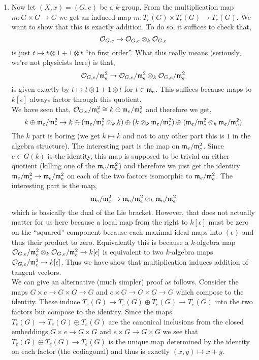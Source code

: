 \documentclass[12pt]{article}
\begin{document}
\begin{enumerate}
\item Now let $(X, x) = (G, e)$ be a $k$-group. From the multiplication map $m : G \times G \to G$ we get an induced map $m : T_e(G) \times T_e(G) \to T_e(G)$. We want to show that this is exactly addition. To do so, it suffices to check that,
\[ \mathcal{O}_{G, e} \to \mathcal{O}_{G, e} \otimes_k \mathcal{O}_{G, e} \]
is just $t \mapsto t \otimes 1 + 1 \otimes t$ ``to first order''. What this really means (seriously, we're not physicists here) is that,
\[ \mathcal{O}_{G, e}/\mathfrak{m}_e^2 \to \mathcal{O}_{G, e} / \mathfrak{m}_e^2 \otimes_k \mathcal{O}_{G, e} / \mathfrak{m}_e^2 \]
is given exactly by $t \mapsto t \otimes 1 + 1 \otimes t$ for $t \in \mathfrak{m}_e$. This suffices because maps to $k[\epsilon]$ always factor through this quotient.
\bigskip\\
We have seen that, $\mathcal{O}_{G, e}  / \mathfrak{m}_e^2 \cong k \oplus \mathfrak{m}_e / \mathfrak{m}_e^2$ and therefore we get,
\[ k \oplus \mathfrak{m}_e / \mathfrak{m}_e^2 \to k \oplus (\mathfrak{m}_e / \mathfrak{m}_e^2 \otimes_k k) \oplus (k \otimes_k \mathfrak{m}_e / \mathfrak{m}_e^2) \oplus (\mathfrak{m}_e / \mathfrak{m}_e^2 \otimes_k \mathfrak{m}_e / \mathfrak{m}_e^2) \]
The $k$ part is boring (we get $k \mapsto k$ and not to any other part this is $1$ in the algebra structure). The interesting part is the map on $\mathfrak{m}_e / \mathfrak{m}_e^2$. Since $e \in G(k)$ is the identity, this map is supposed to be trivial on either quotient (killing one of the $\mathfrak{m}_e / \mathfrak{m}_e^2$) and therefore we just get the identity $\mathfrak{m}_e / \mathfrak{m}_e^2 \to \mathfrak{m}_e / \mathfrak{m}_e^2$ on each of the two factors isomorphic to $\mathfrak{m}_e / \mathfrak{m}_e^2$. The interesting part is the map,
\[ \mathfrak{m}_e / \mathfrak{m}_e^2 \to \mathfrak{m}_e / \mathfrak{m}_e^2 \otimes_k \mathfrak{m}_e / \mathfrak{m}_e^2 \]
which is basically the dual of the Lie bracket. However, that does not actually matter for us here because a local map from the right to $k[\epsilon]$ must be zero on the ``squared'' component because each maximal ideal maps into $(\epsilon)$ and thus their product to zero. Equivalently this is because a $k$-algebra map $\mathcal{O}_{G, e} / \mathfrak{m}_e^2 \otimes_k \mathcal{O}_{G, e} / \mathfrak{m}_e^2 \to k[\epsilon]$ is equivalent to two $k$-algebra maps $\mathcal{O}_{G, e} / \mathfrak{m}_e^2 \to k[\epsilon]$. Thus we have show that multiplication induces addition of tangent vectors.
\bigskip\\
We can give an alternative (much simpler) proof as follows. Consider the maps $G \times e \to G \times G \to G$ and $e \times G \to G \times G \to G$ which compose to the identity. These induce $T_e(G) \to T_e(G) \oplus T_e(G) \to T_e(G)$ into the two factors but compose to the identity. Since the maps $T_e(G) \to T_e(G) \oplus T_e(G)$ are the canonical inclusions from the closed embeddings $G \times e \to G \times G$ and $e \times G \to G \times G$ we see that $T_e(G) \oplus T_e(G) \to T_e(G)$ is the unique map determined by the identity on each factor (the codiagonal) and thus is exactly $(x,y) \mapsto x + y$. 
\end{enumerate}
\end{document}
